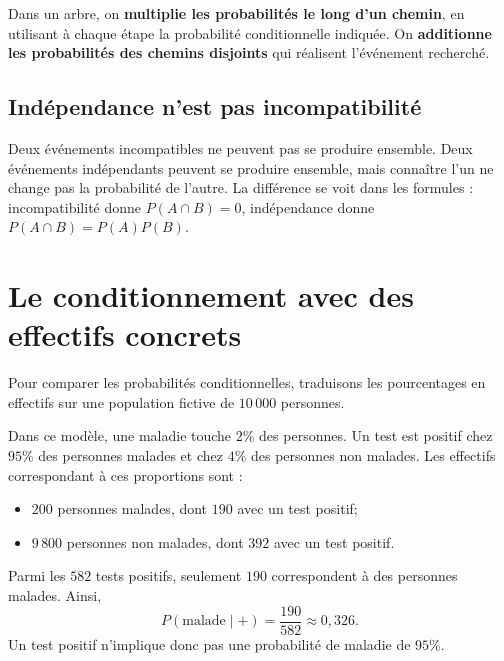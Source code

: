 \begin{center}
\end{center}

\begin{connectionbox}
Dans un arbre, on \textbf{multiplie les probabilités le long d'un chemin}, en utilisant à chaque étape la probabilité conditionnelle indiquée. On \textbf{additionne les probabilités des chemins disjoints} qui réalisent l'événement recherché.
\end{connectionbox}

\subsection{Indépendance n'est pas incompatibilité}
Deux événements incompatibles ne peuvent pas se produire ensemble. Deux événements indépendants peuvent se produire ensemble, mais connaître l'un ne change pas la probabilité de l'autre. La différence se voit dans les formules : incompatibilité donne $P(A\cap B)=0$, indépendance donne $P(A\cap B)=P(A)P(B)$.


\section{Le conditionnement avec des effectifs concrets}
\label{manual:section:08.08}

Pour comparer les probabilités conditionnelles, traduisons les pourcentages en effectifs sur une population fictive de $10\,000$ personnes.

Dans ce modèle, une maladie touche $2\%$ des personnes. Un test est positif chez $95\%$ des personnes malades et chez $4\%$ des personnes non malades. Les effectifs correspondant à ces proportions sont :
\begin{itemize}
\item $200$ personnes malades, dont $190$ avec un test positif;
\item $9\,800$ personnes non malades, dont $392$ avec un test positif.
\end{itemize}
Parmi les $582$ tests positifs, seulement $190$ correspondent à des personnes malades. Ainsi,
\[
P(\text{malade}\mid +)=\frac{190}{582}\approx0{,}326.
\]
Un test positif n'implique donc pas une probabilité de maladie de $95\%$.

